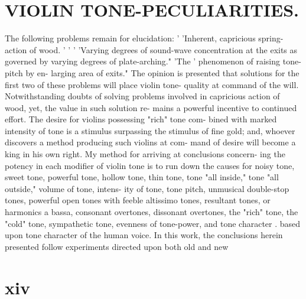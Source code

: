 \documentclass{article}
\begin{document}
\section*{VIOLIN TONE-PECULIARITIES.}
The following problems remain for elucidation: ' 'Inherent, capricious spring-action of wood. ' ' ' 'Varying degrees of sound-wave concentration at the exits as governed by varying degrees of plate-arching." 'The ' phenomenon of raising tone-pitch by en- larging area of exits." The opinion is presented that solutions for the first two of these problems will place violin tone- quality at command of the will. Notwithstanding doubts of solving problems involved in capricious action of wood, yet, the value in such solution re- mains a powerful incentive to continued effort. The desire for violins possessing "rich" tone com- bined with marked intensity of tone is a stimulus surpassing the stimulus of fine gold; and, whoever discovers a method producing such violins at com- mand of desire will become a king in his own right. My method for arriving at conclusions concern- ing the potency in each modifier of violin tone is to run down the causes for noisy tone, sweet tone, powerful tone, hollow tone, thin tone, tone "all inside," tone "all outside," volume of tone, intens- ity of tone, tone pitch, unmusical double-stop tones, powerful open tones with feeble altissimo tones, resultant tones, or harmonics a bassa, consonant overtones, dissonant overtones, the "rich" tone, the "cold" tone, sympathetic tone, evenness of tone-power, and tone character . based upon tone character of the human voice. In this work, the conclusions herein presented follow experiments directed upon both old and new

\section*{xiv}
\end{document}
